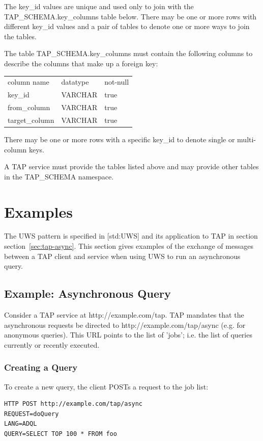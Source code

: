 \documentclass[11pt,letter]{ivoa}
\begin{document}
{The key\_id values are unique and used only to join with the 
TAP\_SCHEMA.key\_columns table below. There may be 
one or more rows with different key\_id values and a pair 
of tables to denote one or more ways to join the tables.

The table TAP\_SCHEMA.key\_columns must contain the 
following columns to describe the columns that make up a foreign key:

\begin{tabular}{l l l}
\label{tab:tap-schema-key-columns}
column name & datatype & not-null \\
key\_id & VARCHAR & true \\
from\_column & VARCHAR & true \\
target\_column & VARCHAR & true \\
\end{tabular}

There may be one or more rows with a specific key\_id to 
denote single or multi-column keys.

A TAP service must provide the tables listed above and may provide other tables 
in the TAP\_SCHEMA namespace.


\section{Examples}
\label{sec:examples}

The UWS pattern is specified in [std:UWS] and its application to TAP in section 
section~\ref{sec:tap-async}. This section gives examples of the exchange of messages between a 
TAP client and service when using UWS to run an asynchronous query.

\subsection{Example: Asynchronous Query}
Consider a TAP service at http://example.com/tap. TAP mandates that the 
asynchronous requests be directed to http://example.com/tap/async (e.g. for 
anonymous queries). This URL points to the list of 'jobs'; i.e. the list of 
queries currently or recently executed.

\subsubsection{Creating a Query}
To create a new query, the client POSTs a request to the job list:

\begin{verbatim}
HTTP POST http://example.com/tap/async
REQUEST=doQuery
LANG=ADQL
QUERY=SELECT TOP 100 * FROM foo
\end{verbatim}

}
\end{document}
